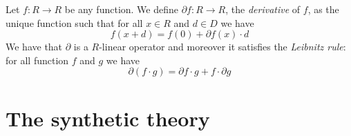 \begin{definition}
  \label{SDG.deriv}
  \leanok
  Let $f \colon R \to R$ be any function. We define $\partial f \colon R \to R$, the \emph{derivative} of $f$, as the unique function such that for all $x \in R$ and $d \in D$ we have
\[
f(x + d)=f(0)+\partial f(x) \cdot d
\]
We have that $\partial$ is a $R$-linear operator and moreover it satisfies the \emph{Leibnitz rule}: for all function $f$ and $g$ we have
\[
\partial(f \cdot g) = \partial f \cdot g + f \cdot \partial g
\]
\end{definition}

\section{The synthetic theory}
